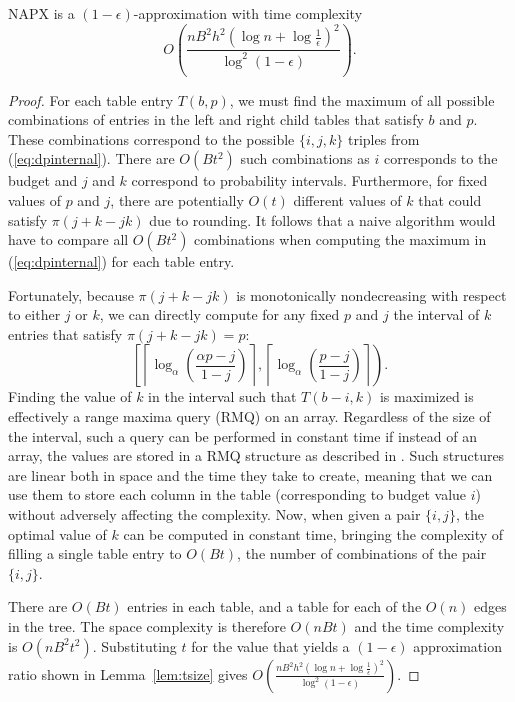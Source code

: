 \documentclass[10pt]{llncs}       \usepackage{graphicx,subfigure}
\begin{document}
\begin{theorem}
  \label{thm:ptas}
NAPX is a $(1-\epsilon)$-approximation with time complexity
\begin{equation*}
O\left(\frac{n B^2 h^2 \left(\log{n} + \log{\frac{1}{\epsilon}}\right)^2}
{\log^2(1 - \epsilon)}\right). 
\end{equation*}
\end{theorem}
\begin{proof}
For each table entry $T(b,p)$, we must find the maximum
of all possible combinations of
entries in the left and right child tables that satisfy $b$ and $p$.  These
combinations correspond to the possible $\{i,j,k\}$ triples from 
 (\ref{eq:dpinternal}).  There are $O(Bt^2)$ such combinations as $i$ 
corresponds to the budget and $j$ and $k$ correspond to probability intervals.
Furthermore, for fixed values of $p$ and $j$, there are potentially 
$O(t)$ different values of $k$ that could satisfy $\pi(j + k -jk)$ due to
rounding. It follows that a naive algorithm would have to compare all
$O(Bt^2)$ combinations when computing the maximum in (\ref{eq:dpinternal})
for each table entry. 

Fortunately, because $\pi(j + k -jk)$ is 
monotonically nondecreasing with respect to either
$j$ or $k$, we can directly compute for any fixed $p$ and $j$ the
interval of $k$ entries that satisfy $\pi(j + k - jk) = p$:
\begin{equation*}
  \left[ \left\lceil \log_\alpha \left( \frac{\alpha p - j}{1 - j} \right) 
      \right\rceil,
    \left\lceil \log_\alpha \left( \frac{p - j}{1- j} \right) \right\rceil
    \right).
\end{equation*}
Finding the value of $k$ in the interval such that $T(b-i, k)$ is maximized
is effectively a range maxima query (RMQ) on an array. Regardless of the size 
of the interval, such a query can be performed in constant time if instead
of an array, the values are stored in a RMQ structure as described in 
\cite{bender00}.  Such structures are linear both in space and the time they
take to create, meaning that we can use them to store each column in the table 
(corresponding to budget value $i$) without adversely affecting the complexity.
Now, when given a pair $\{i,j\}$, the optimal value of $k$ can be computed in
constant time, bringing the complexity of filling a single table entry to
$O(Bt)$, the number of combinations of the pair $\{i,j\}$.   

There are $O(Bt)$ entries in each table, and a table for each of the $O(n)$
edges in the tree. The space complexity is therefore $O(nBt)$ and the time
complexity is $O(nB^2t^2)$. Substituting $t$ for the value that yields
a $(1 - \epsilon)$ approximation ratio shown in
Lemma~\ref{lem:tsize} gives
$\displaystyle O\left(\frac{nB^2h^2\left(\log{n} + \log{\frac{1}{\epsilon}}\right)^2}
{\log^2(1-\epsilon)}\right)$.

\end{proof}
\end{document}
